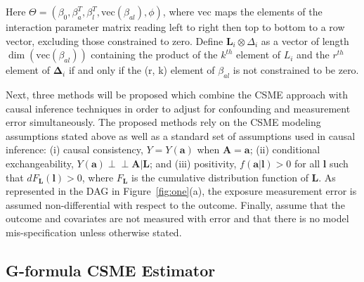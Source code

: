 \documentclass[useAMS,usenatbib,referee]{biom}
\begin{document}
Here $\Theta = (\beta_{0}, \beta^{T}_{a}, \beta^{T}_{l}, \text{vec}(\beta_{al}), \phi)$, where $\text{vec}$ maps the elements of the interaction parameter matrix reading left to right then top to bottom to a row vector, excluding those constrained to zero. Define $\bm{L}_{i} \otimes \Delta_{i}$ as a vector of length $\dim(\text{vec}(\beta_{al}))$ containing the product of the $k^{th}$ element of $L_{i}$ and the $r^{th}$ element of $\bm{\Delta}_{i}$ if and only if the (r, k) element of $\beta_{al}$ is not constrained to be zero.

Next, three methods will be proposed which combine the CSME approach with causal inference techniques in order to adjust for confounding and measurement error simultaneously. The proposed methods rely on the CSME modeling assumptions stated above as well as a standard set of assumptions used in causal inference: (i) causal consistency, $Y = Y(\bm{a})$ when $\bm{A} = \bm{a}$; (ii) conditional exchangeability, $Y(\bm{a}) \perp \!\!\! \perp \bm{A} | \bm{L}$; and (iii) positivity, $f(\bm{a} | \bm{l}) > 0$ for all $\bm{l}$ such that $dF_{\bm{L}}(\bm{l}) > 0$, where $F_{\bm{L}}$ is the cumulative distribution function of $\bm{L}$. As represented in the DAG in Figure~\ref{fig:one}(a), the exposure measurement error is assumed non-differential with respect to the outcome. Finally, assume that the outcome and covariates are not measured with error and that there is no model mis-specification unless otherwise stated.

\subsection{G-formula CSME Estimator}
\end{document}
